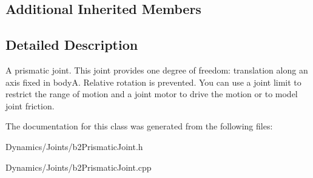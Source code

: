 \subsection*{Additional Inherited Members}


\subsection{Detailed Description}
A prismatic joint. This joint provides one degree of freedom\+: translation along an axis fixed in bodyA. Relative rotation is prevented. You can use a joint limit to restrict the range of motion and a joint motor to drive the motion or to model joint friction. 

The documentation for this class was generated from the following files\+:\begin{DoxyCompactItemize}
\item 
Dynamics/\+Joints/b2\+Prismatic\+Joint.\+h\item 
Dynamics/\+Joints/b2\+Prismatic\+Joint.\+cpp\end{DoxyCompactItemize}
